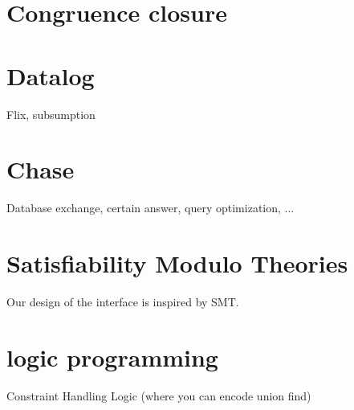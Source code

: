 
\section{Congruence closure}

\section{Datalog}

Flix, subsumption

\section{Chase}

Database exchange, certain answer, query optimization, ...

\section{Satisfiability Modulo Theories}

Our design of the interface is inspired by SMT.

\section{logic programming}

Constraint Handling Logic (where you can encode union find)
